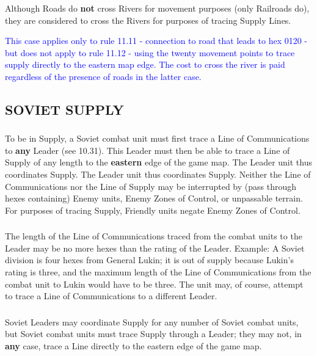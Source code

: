 \subsubsection{} Although Roads do \textbf{not} cross Rivers for movement purposes (only Railroads do), they are considered to cross the Rivers for purposes of tracing Supply Lines.

\textcolor{blue}{This case applies only to rule 11.11 - connection to road that leads to hex 0120 - but does not apply to rule 11.12 - using the twenty movement points to trace supply directly to the eastern map edge. The cost to cross the river is paid regardless of the presence of roads in the latter case.}

\subsection{SOVIET SUPPLY}

\subsubsection{} To be in Supply, a Soviet combat unit must first trace a Line of Communications to \textbf{any} Leader (see 10.31). This Leader must then be able to trace a Line of Supply of any length to the \textbf{eastern} edge of the game map. The Leader unit thus coordinates Supply. The Leader unit thus coordinates Supply. Neither the Line of Communications nor the Line of Supply may be interrupted by (pass through hexes containing) Enemy units, Enemy Zones of Control, or unpassable terrain. For purposes of tracing Supply, Friendly units negate Enemy Zones of Control.

\subsubsection{} The length of the Line of Communications traced from the combat units to the Leader may be no more hexes than the rating of the Leader. Example: A Soviet division is four hexes from General Lukin; it is out of supply because Lukin's rating is three, and the maximum length of the Line of Communications from the combat unit to Lukin would have to be three. The unit may, of course, attempt to trace a Line of Communications to a different Leader.

\subsubsection{} Soviet Leaders may coordinate Supply for any number of Soviet combat units, but Soviet combat units must trace Supply through a Leader; they may not, in \textbf{any} case, trace a Line directly to the eastern edge of the game map.

